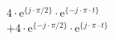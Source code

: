\correct
\begin{align*}
&  4 \cdot \textrm{e}^{\{ j \cdot \pi/2 \}} \cdot \textrm{e}^{\{-j \cdot \pi \cdot t \}} \\
&+ 4 \cdot \textrm{e}^{\{-j \cdot \pi/2 \}} \cdot \textrm{e}^{\{ j \cdot \pi \cdot t \}}
\end{align*}
